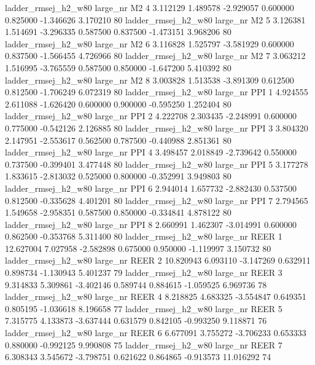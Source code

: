 ladder_rmsej_h2_w80   large_nr       M2                 4  3.112129  1.489578  -2.929057 0.600000 0.825000 -1.346626    3.170210 80
ladder_rmsej_h2_w80   large_nr       M2                 5  3.126381  1.514691  -3.296335 0.587500 0.837500 -1.473151    3.968206 80
ladder_rmsej_h2_w80   large_nr       M2                 6  3.116828  1.525797  -3.581929 0.600000 0.837500 -1.566455    4.726966 80
ladder_rmsej_h2_w80   large_nr       M2                 7  3.063212  1.516995  -3.765559 0.587500 0.850000 -1.647200    5.410392 80
ladder_rmsej_h2_w80   large_nr       M2                 8  3.003828  1.513538  -3.891309 0.612500 0.812500 -1.706249    6.072319 80
ladder_rmsej_h2_w80   large_nr      PPI                 1  4.924555  2.611088  -1.626420 0.600000 0.900000 -0.595250    1.252404 80
ladder_rmsej_h2_w80   large_nr      PPI                 2  4.222708  2.303435  -2.248991 0.600000 0.775000 -0.542126    2.126885 80
ladder_rmsej_h2_w80   large_nr      PPI                 3  3.804320  2.147951  -2.553617 0.562500 0.787500 -0.440988    2.851361 80
ladder_rmsej_h2_w80   large_nr      PPI                 4  3.498457  2.018849  -2.739642 0.550000 0.737500 -0.399401    3.477448 80
ladder_rmsej_h2_w80   large_nr      PPI                 5  3.177278  1.833615  -2.813032 0.525000 0.800000 -0.352991    3.949803 80
ladder_rmsej_h2_w80   large_nr      PPI                 6  2.944014  1.657732  -2.882430 0.537500 0.812500 -0.335628    4.401201 80
ladder_rmsej_h2_w80   large_nr      PPI                 7  2.794565  1.549658  -2.958351 0.587500 0.850000 -0.334841    4.878122 80
ladder_rmsej_h2_w80   large_nr      PPI                 8  2.660991  1.462307  -3.014991 0.600000 0.862500 -0.353768    5.311400 80
ladder_rmsej_h2_w80   large_nr     REER                 1 12.627004  7.027958  -2.582898 0.675000 0.950000 -1.119997    3.150732 80
ladder_rmsej_h2_w80   large_nr     REER                 2 10.820943  6.093110  -3.147269 0.632911 0.898734 -1.130943    5.401237 79
ladder_rmsej_h2_w80   large_nr     REER                 3  9.314833  5.309861  -3.402146 0.589744 0.884615 -1.059525    6.969736 78
ladder_rmsej_h2_w80   large_nr     REER                 4  8.218825  4.683325  -3.554847 0.649351 0.805195 -1.036618    8.196658 77
ladder_rmsej_h2_w80   large_nr     REER                 5  7.315775  4.133873  -3.637444 0.631579 0.842105 -0.993250    9.118871 76
ladder_rmsej_h2_w80   large_nr     REER                 6  6.677091  3.755272  -3.706233 0.653333 0.880000 -0.992125    9.990808 75
ladder_rmsej_h2_w80   large_nr     REER                 7  6.308343  3.545672  -3.798751 0.621622 0.864865 -0.913573   11.016292 74
